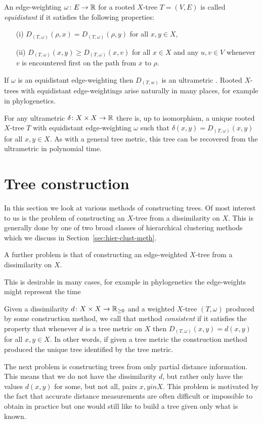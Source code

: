 An edge-weighting $\omega \colon E \to {\mathbb R}$ for a rooted $X$-tree $T=(V,E)$ is
called \textit{equidistant} if it satisfies the following properties:
\begin{itemize}
\item[(i)] $D_{(T,\omega)}(\rho,x) = D_{(T,\omega)}(\rho,y)$ for all $x,y \in X$,
\item[(ii)] $D_{(T,\omega)}(x,y) \geq D_{(T,\omega)}(x,v)$ for all $x \in X$
  and any $u,v \in V$ whenever $v$ is encountered first on the path from $x$
  to $\rho$.
\end{itemize}
If $\omega$ is an equidistant edge-weighting then $D_{(T,w)}$ is an
ultrametric \citep{semple2003phylogenetics}.  Rooted $X$-trees with
equidistant edge-weightings arise naturally in many places, for example in
phylogenetics.

For any ultrametric $\delta \colon X \times X \to {\mathbb R}$ there is, up to
isomorphism, a unique rooted $X$-tree $T$ with equidistant edge-weighting
$\omega$ such that $\delta(x,y) = D_{(T,\omega)}(x,y)$ for all $x,y \in X$.
As with a general tree metric, this tree can be recovered from the ultrametric
in polynomial time.

\section{Tree construction}
\label{sec:tree-construction}

In this section we look at various methods of constructing trees.  Of most
interest to us is the problem of constructing an $X$-tree from a dissimilarity
on $X$.  This is generally done by one of two broad classes of hierarchical
clustering methods which we discuss in Section~\ref{sec:hier-clust-meth}.

A further problem is that of constructing an edge-weighted $X$-tree from a
dissimilarity on $X$.

This is desirable in many cases, for example in
phylogenetics the edge-weights might represent the time 

Given a
dissimilarity $d \colon X \times X \to {\mathbb R}_{\geq 0}$ and a weighted $X$-tree
$(T,\omega)$ produced by some construction method, we call that method
\textit{consistent} if it satisfies the property that whenever $d$ is a tree
metric on $X$ then $D_{(T,\omega)}(x,y) = d(x,y)$ for all $x,y \in X$.  In
other words, if given a tree metric the construction method produced the
unique tree identified by the tree metric.

The next problem is constructing trees from only partial distance information.
This means that we do not have the dissimilarity $d$, but rather only have the
values $d(x,y)$ for some, but not all, pairs $x,y in X$.  This problem is
motivated by the fact that accurate distance measurements are often difficult
or impossible to obtain in practice but one would still like to build a tree
given only what is known.

